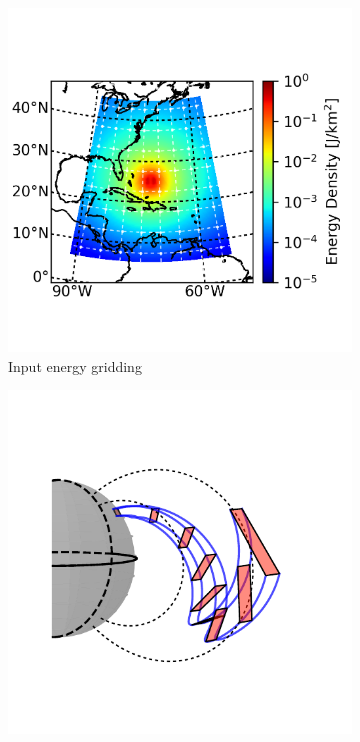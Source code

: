     \begin{figure}
    \centering
    \begin{subfigure}[t]{0.45\textwidth}
    \centering
        	\includegraphics{figures/input_energy_with_grid.png}
	\caption{Input energy gridding}
        \label{fig:input_energy_grid}
    \end{subfigure}\hfill
    \begin{subfigure}[t]{0.45\textwidth}
    \centering
        	\includegraphics[trim={1cm 0.25cm 1cm 1cm},clip]{figures/interpolation_globe1.pdf}

\end{subfigure}
\end{figure}
